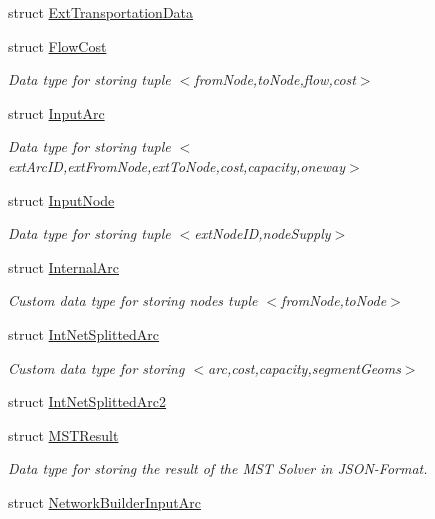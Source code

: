 \begin{DoxyCompactItemize}
struct \hyperlink{structnetxpert_1_1data_1_1ExtTransportationData}{Ext\+Transportation\+Data}
\item 
struct \hyperlink{structnetxpert_1_1data_1_1FlowCost}{Flow\+Cost}
\begin{DoxyCompactList}\small\item\em Data type for storing tuple $<$from\+Node,to\+Node,flow,cost$>$ \end{DoxyCompactList}\item 
struct \hyperlink{structnetxpert_1_1data_1_1InputArc}{Input\+Arc}
\begin{DoxyCompactList}\small\item\em Data type for storing tuple $<$ext\+Arc\+ID,ext\+From\+Node,ext\+To\+Node,cost,capacity,oneway$>$ \end{DoxyCompactList}\item 
struct \hyperlink{structnetxpert_1_1data_1_1InputNode}{Input\+Node}
\begin{DoxyCompactList}\small\item\em Data type for storing tuple $<$ext\+Node\+ID,node\+Supply$>$ \end{DoxyCompactList}\item 
struct \hyperlink{structnetxpert_1_1data_1_1InternalArc}{Internal\+Arc}
\begin{DoxyCompactList}\small\item\em Custom data type for storing nodes tuple $<$from\+Node,to\+Node$>$ \end{DoxyCompactList}\item 
struct \hyperlink{structnetxpert_1_1data_1_1IntNetSplittedArc}{Int\+Net\+Splitted\+Arc}
\begin{DoxyCompactList}\small\item\em Custom data type for storing $<$arc,cost,capacity,segment\+Geoms$>$ \end{DoxyCompactList}\item 
struct \hyperlink{structnetxpert_1_1data_1_1IntNetSplittedArc2}{Int\+Net\+Splitted\+Arc2}
\item 
struct \hyperlink{structnetxpert_1_1data_1_1MSTResult}{M\+S\+T\+Result}
\begin{DoxyCompactList}\small\item\em Data type for storing the result of the M\+ST Solver in J\+S\+O\+N-\/\+Format. \end{DoxyCompactList}\item 
struct \hyperlink{structnetxpert_1_1data_1_1NetworkBuilderInputArc}{Network\+Builder\+Input\+Arc}

\end{DoxyCompactItemize}
